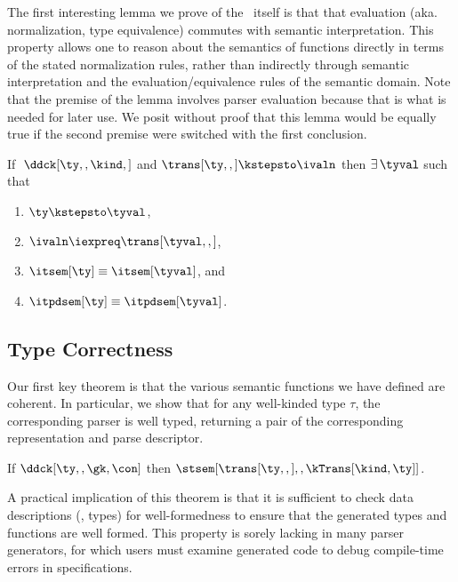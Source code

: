 The first interesting lemma we prove of the \ddc\ itself
is that that evaluation (aka. normalization,
type equivalence) commutes with semantic interpretation.
This property allows one to
reason about the semantics of \ddc{} functions directly in terms of
the stated normalization rules, rather than indirectly through
semantic interpretation and the evaluation/equivalence rules of the
semantic domain. 
Note that the premise of the lemma involves parser
evaluation because that is what is needed for later use. We posit without
proof that this lemma would be equally true if the second
premise were switched with the first conclusion.


\begin{lemma}
  If $\; \ddck[\ty,,\kind,]$ and $\trans[\ty,,] \kstepsto \ivaln$ then
  $\exists\, \tyval$ such that
  \begin{enumerate}
  \item $\ty \kstepsto \tyval$,
  \item $\ivaln \iexpreq \trans[\tyval,,]$,
  \item $\itsem[\ty] \equiv \itsem[\tyval]$, and
  \item $\itpdsem[\ty] \equiv \itpdsem[\tyval]$.
  \end{enumerate}
\end{lemma}

\subsection{Type Correctness}
Our first key theorem is that the various semantic
functions we have defined are coherent.  In particular, we show that
for any well-kinded \ddca{} type $\tau$, the corresponding parser is
well typed, returning a pair of the corresponding representation and
parse descriptor.


\begin{theorem}
\label{thm:s-type-correctness}
  If $\ddck[\ty,,\gk,\con]$ then
  $\stsem[{\trans[\ty,,]},,\kTrans[\kind,\ty]]$.
\end{theorem}

A practical implication of this theorem is that it is sufficient to check data descriptions (\ie{}, \ddca{} types) for well-formedness to ensure that the generated types and functions are well formed. This property is sorely lacking in many parser generators, for which users must examine generated code to debug compile-time errors in specifications.

